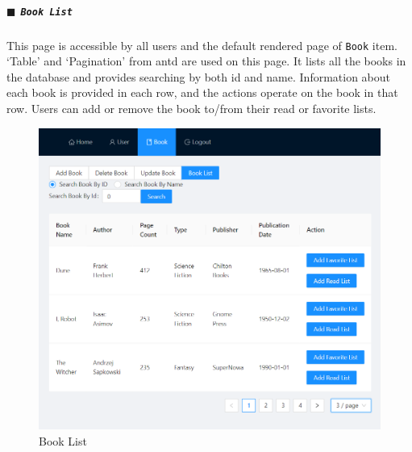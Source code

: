 \subparagraph{$\blacksquare$ \texttt{Book List}}

This page is accessible by all users and the default rendered page of \texttt{Book} item. `Table' and `Pagination' from antd are used on this page. It lists all the books in the database and provides searching by both id and name. Information about each book is provided in each row, and the actions operate on the book in that row. Users can add or remove the book to/from their read or favorite lists.

\begin{minipage}{.49\textwidth}
  \begin{figure}[H]
    \centering
    \includegraphics[width=\linewidth]{img/front-end/book-list.png}
    \caption{Book List}
  \end{figure}
\end{minipage}
